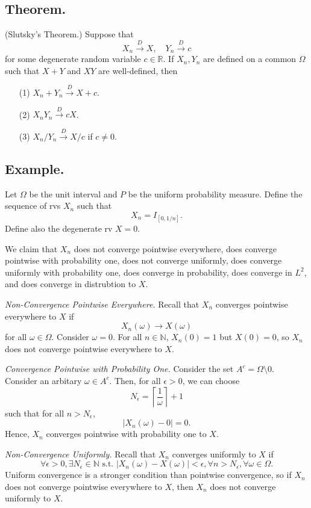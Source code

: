 \documentclass[titlepage]{article}
\begin{document}
\subsection{Theorem.} (Slutsky's Theorem.) Suppose that 
$$X_{n} \xrightarrow{D} X, \quad Y_{n} \xrightarrow{D} c$$
for some degenerate random variable $c \in \mathbb{R}$. If $X_{n}, Y_{n}$ are defined on a common $\Omega$ such that $X+Y$ and $XY$ are well-defined, then 
\begin{enumerate}
\item[(1)] $X_{n} + Y_{n} \xrightarrow{D} X + c$.
\item[(2)] $X_{n}Y_{n} \xrightarrow{D} cX$.
\item[(3)] $X_{n}/Y_{n} \xrightarrow{D} X/c$ if $c \neq 0$.
\end{enumerate}

\subsection{Example.} Let $\Omega$ be the unit interval and $P$ be the uniform probability measure. Define the sequence of rvs $X_{n}$ such that 
$$X_{n} = I_{[0, 1/n]}.$$
Define also the degenerate rv $X = 0$.

We claim that $X_{n}$ does not converge pointwise everywhere, does converge pointwise with probability one, does not converge uniformly, does converge uniformly with probability one, does converge in probability, does converge in $L^{2}$, and does converge in distrubtion to $X$.

\textit{Non-Convergence Pointwise Everywhere.} Recall that $X_{n}$ converges pointwise everywhere to $X$ if 
$$X_{n}(\omega) \to X(\omega)$$
for all $\omega \in \Omega$. Consider $\omega = 0$. For all $n \in \mathbb{N}$, $X_{n}(0) = 1$ but $X(0) = 0$, so $X_{n}$ does not converge pointwise everywhere to $X$.

\textit{Convergence Pointwise with Probability One.} Consider the set $A^{c} = \Omega \setminus 0$. Consider an arbitary $\omega \in A^{c}$. Then, for all $\epsilon > 0$, we can choose 
$$N_{\epsilon} = \left\lceil \frac{1}{\omega} \right\rceil + 1$$
such that for all $n > N_{\epsilon}$,
$$|X_{n}(\omega) - 0| = 0.$$
Hence, $X_{n}$ converges pointwise with probability one to $X$.

\textit{Non-Convergence Uniformly.} Recall that $X_{n}$ converges uniformly to $X$ if
$$\forall \epsilon > 0, \exists N_{\epsilon} \in \mathbb{N} \text{ s.t. } |X_{n}(\omega) - X(\omega)| < \epsilon, \forall n > N_{\epsilon}, \forall \omega \in \Omega.$$
Uniform convergence is a stronger condition than pointwise convergence, so if $X_{n}$ does not converge pointwise everywhere to $X$, then $X_{n}$ does not converge uniformly to $X$.
\end{document}
